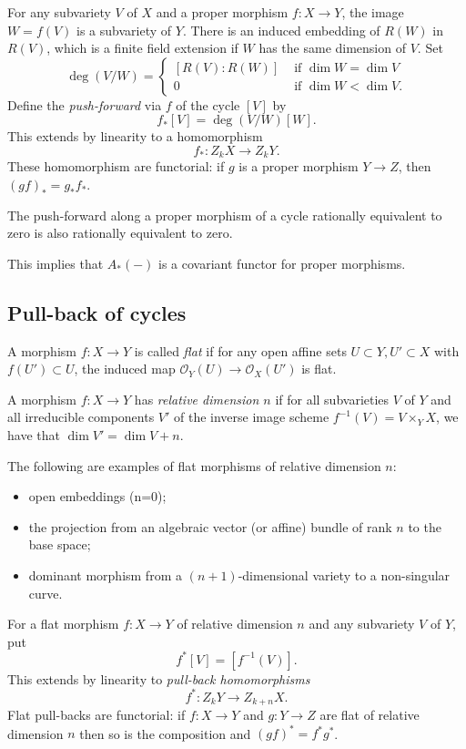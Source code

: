 \documentclass[a4paper,openany]{scrbook}
\begin{document}
For any subvariety $V$ of $X$ and a proper morphism $f\colon X\to Y$, the image $W=f(V)$ is a subvariety of $Y$. There is an induced embedding of $R(W)$ in $R(V)$, which is a finite field extension if $W$ has the same dimension of $V$. Set
\[
\deg(V/W)=
\begin{cases}
[R(V):R(W)] &\text{ if } \dim W =\dim V\\
0  &\text{ if } \dim W <\dim V.
\end{cases}
\]
Define the \emph{push-forward} via $f$ of the cycle $[V]$ by
\[
f_*[V]=\deg(V/W)[W].
\]
This extends by linearity to a homomorphism
\[
f_*:Z_kX\to Z_kY.
\]
These homomorphism are functorial: if $g$ is a proper morphism $Y\to Z$, then $(gf)_*=g_*f_*$.
\begin{thm}
 The push-forward along a proper morphism of a cycle rationally equivalent to zero is also rationally equivalent to zero.
\end{thm}

This implies that $A_*(-)$ is a covariant functor for proper morphisms.

\subsection{Pull-back of cycles}

A morphism $f\colon X\to Y$ is called \emph{flat} if for any open affine sets $U\subset Y, U'\subset X$ with $f(U')\subset U$, the induced map $\mathcal O_Y(U)\to \mathcal O_X(U')$ is flat.

A morphism $f\colon X\to Y$ has \emph{relative dimension $n$} if for all subvarieties $V$ of $Y$ and all irreducible components $V'$ of the inverse image scheme $f^{-1}(V) = V \times_Y X$, we have that $\dim V' = \dim V +n$.

\begin{example}
 The following are examples of flat morphisms of relative dimension $n$:
 \begin{itemize}
  \item open embeddings (n=0);
  \item the projection from an algebraic vector (or affine) bundle of rank $n$ to the base space;
  \item dominant morphism from a $(n+1)$-dimensional variety to a non-singular curve.
 \end{itemize}
\end{example}

For a flat morphism $f\colon X\to Y$ of relative dimension $n$ and any subvariety $V$ of $Y$, put
\[
f^*[V]=[f^{-1}(V)].
\]
This extends by linearity to \emph{pull-back homomorphisms}
\[
f^*:Z_kY\to Z_{k+n}X.
\]
Flat pull-backs are functorial: if $f\colon X\to Y$ and $g\colon Y\to Z$ are flat of relative dimension $n$ then so is the composition and $(gf)^*=f^*g^*$. 
\end{document}
